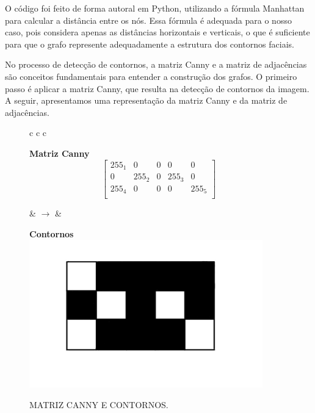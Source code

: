 O código foi feito de forma autoral em Python, utilizando a fórmula Manhattan para calcular a distância entre os nós. Essa fórmula é adequada para o nosso caso, pois considera apenas as distâncias horizontais e verticais, o que é suficiente para que o grafo represente adequadamente a estrutura dos contornos faciais.

No processo de detecção de contornos, a matriz Canny e a matriz de adjacências são conceitos fundamentais para entender a construção dos grafos. O primeiro passo é aplicar a matriz Canny, que resulta na detecção de contornos da imagem. A seguir, apresentamos uma representação da matriz Canny e da matriz de adjacências.

\begin{figure}[ht]
    \caption{MATRIZ CANNY E CONTORNOS.}
    \label{fig:canny-contornos}
    \centering
    \begin{tabular}{c c c}
        \begin{minipage}{0.4\textwidth}
            \centering
            \textbf{Matriz Canny}\\ [0.2cm]
            \[
            \begin{bmatrix}
                255_1 & 0 & 0 & 0 & 0 \\
                0 & 255_2 & 0 & 255_3 & 0 \\
                255_4 & 0 & 0 & 0 & 255_5 \\
            \end{bmatrix}
            \]
        \end{minipage}
        \hspace{0.5cm}
        
        & $\rightarrow$ &
        \begin{minipage}{0.4\textwidth}
            \centering
            \textbf{Contornos}\\ [0.2cm]
            \includegraphics[width=0.9\textwidth]{fig/contorno_canny.jpeg}
        \end{minipage}
    \end{tabular}
    \end{figure}

